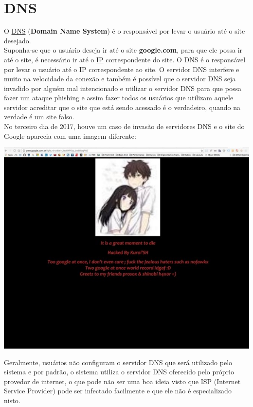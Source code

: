 \documentclass[12pt, letterpaper]{report}
\begin{document}
\pagebreak

\section*{DNS}
	O \href{https://criptowiki.miraheze.org/wiki/DNS_(Domain_Name_System)}{DNS} (\textbf{Domain Name System}) é o responsável por levar o usuário até o site desejado.\\
	Suponha-se que o usuário deseja ir até o site \textbf{google.com}, para que ele possa ir até o site, é necessário ir até o \href{https://pt.wikipedia.org/wiki/IP}{IP} correspondente do site. O DNS é o responsável por levar o usuário até o IP correspondente ao site.
	O servidor DNS interfere e muito na velocidade da conexão e também é possível que o servidor DNS seja invadido por alguém mal intencionado e utilizar o servidor DNS para que possa fazer um ataque phishing e assim fazer todos os usuários que utilizam aquele servidor acreditar que o site que está sendo acessado é o verdadeiro, quando na verdade é um site falso.\\

	No terceiro dia de 2017, houve um caso de invasão de servidores DNS e o site do Google aparecia com uma imagem diferente:

\begin{center} %
	\includegraphics[scale=0.7]{dns.jpg}\\
\end{center}

	Geralmente, usuários não configuram o servidor DNS que será utilizado pelo sistema e por padrão, o sistema utiliza o servidor DNS oferecido pelo próprio provedor de internet, o que pode não ser uma boa ideia visto que ISP (Internet Service Provider) pode ser infectado facilmente e que ele não é especializado nisto.\\
\end{document}
